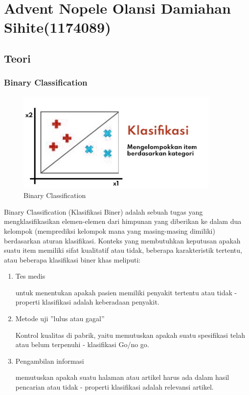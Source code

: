 \section{Advent Nopele Olansi Damiahan Sihite(1174089)}
\subsection{Teori}

\subsubsection{Binary Classification}
\begin{figure}[H]
\centerline{\includegraphics[width=10cm]{figures/1174089/2/1.jpg}}
\caption{Binary Classification}
\label{labelgambar}
\end{figure}
Binary Classification (Klasifikasi Biner) adalah sebuah tugas yang mengklasifikasikan elemen-elemen dari himpunan yang diberikan ke dalam dua kelompok (memprediksi kelompok mana yang masing-masing dimiliki) berdasarkan aturan klasifikasi. Konteks yang membutuhkan keputusan apakah suatu item memiliki sifat kualitatif atau tidak, beberapa karakteristik tertentu, atau beberapa klasifikasi
biner khas meliputi:
\begin{enumerate}
\item Tes medis 

untuk menentukan apakah pasien memiliki penyakit tertentu atau tidak - properti klasifikasi adalah keberadaan penyakit.

\item Metode uji ”lulus atau gagal”

Kontrol kualitas di pabrik, yaitu memutuskan apakah suatu spesifikasi telah atau belum terpenuhi - klasifikasi Go/no go.

\item Pengambilan informasi

memutuskan apakah suatu halaman atau artikel harus ada dalam hasil pencarian atau tidak - properti klasifikasi adalah relevansi artikel.
\end{enumerate}

